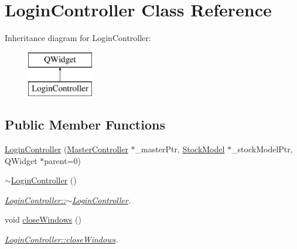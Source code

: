 \hypertarget{class_login_controller}{}\section{Login\+Controller Class Reference}
\label{class_login_controller}
Inheritance diagram for Login\+Controller\+:\begin{figure}[H]
\begin{center}
\leavevmode
\includegraphics[height=2.000000cm]{class_login_controller}
\end{center}
\end{figure}
\subsection*{Public Member Functions}
\begin{DoxyCompactItemize}
\item 
\mbox{\hyperlink{class_login_controller_a0deeca3547d53b2b4c668d89198f4d79}{Login\+Controller}} (\mbox{\hyperlink{class_master_controller}{Master\+Controller}} $\ast$\+\_\+master\+Ptr, \mbox{\hyperlink{class_stock_model}{Stock\+Model}} $\ast$\+\_\+stock\+Model\+Ptr, Q\+Widget $\ast$parent=0)
\item 
\mbox{\label{class_login_controller_ab1dfb02e0f9f71d7d7c8d225a8cad568}} 
\mbox{\hyperlink{class_login_controller_ab1dfb02e0f9f71d7d7c8d225a8cad568}{$\sim$\+Login\+Controller}} ()
\begin{DoxyCompactList}\small\item\em \mbox{\hyperlink{class_login_controller_ab1dfb02e0f9f71d7d7c8d225a8cad568}{Login\+Controller\+::$\sim$\+Login\+Controller}}. \end{DoxyCompactList}\item 
\mbox{\label{class_login_controller_a358f161325a516457b19cbd610805b7a}} 
void \mbox{\hyperlink{class_login_controller_a358f161325a516457b19cbd610805b7a}{close\+Windows}} ()
\begin{DoxyCompactList}\small\item\em \mbox{\hyperlink{class_login_controller_a358f161325a516457b19cbd610805b7a}{Login\+Controller\+::close\+Windows}}. \end{DoxyCompactList}\end{DoxyCompactItemize}


